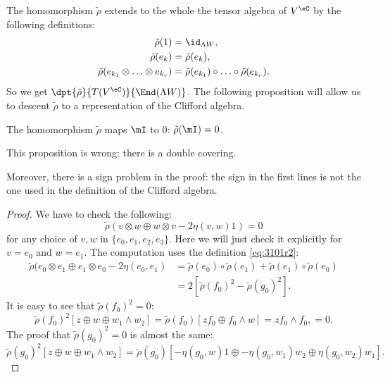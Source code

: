 The homomorphism $\tilde\rho$ extends to the whole the tensor algebra of $V^{\eC}$ by the following definitions:
\begin{subequations}
\begin{align}
 \tilde\rho(1)              &=\id_{\Lambda W},\\
 \tilde\rho(e_k)            &=\tilde\rho(e_k),\\
 \tilde\rho(e_{k_1}\otimes\ldots\otimes e_{k_r})&=
                      \tilde\rho(e_{k_1})\circ\ldots\circ\tilde\rho(e_{k_r}).\label{eq:3101r2}
\end{align}
\end{subequations}
So we get $\dpt{\tilde\rho}{T(V^{\eC})}{\End(\Lambda W)}$.  The following proposition will allow us to descent $\tilde\rho$ to a representation of the Clifford algebra.

\begin{proposition}
The homomorphism $\tilde\rho$ maps $\mI$ to $0$: $\tilde\rho(\mI)=0$.
\end{proposition}

\begin{probleme}
This proposition is wrong: there is a double covering.

Moreover, there is a sign problem in the proof: the sign in the first lines is not the one used in the definition of the Clifford algebra.
\end{probleme}


\begin{proof}
We have to check the following:
\[\tilde\rho(v\otimes w\oplus w\otimes v-2\eta(v,w)1)=0\]
for any choice of
 $v,w$ in $\{e_0,e_1,e_2,e_3\}$.
  Here we will just check it explicitly for $v=e_0$ and $w=e_1$. The computation uses the definition \eqref{eq:3101r2}:
\begin{equation}
\begin{split}
\tilde\rho(e_0\otimes e_1\oplus e_1\otimes
             e_0-2\eta(e_0,e_1)&=\tilde\rho(e_0)\circ\tilde\rho(e_1)+\tilde\rho(e_1)\circ\tilde\rho(e_0)\\
                               &=2\left[\tilde\rho(f_0)^2-\tilde\rho(g_0)^2\right].
\end{split}
\end{equation}
It is easy to see that $\tilde\rho(f_0)^2=0$:
\begin{equation}
 \tilde\rho(f_0)^2\left[z\oplus w\oplus w_1\wedge w_2 \right]=\tilde\rho(f_0)[zf_0\oplus f_0\wedge w]
                                                   =zf_0\wedge f_0,
							=0.
\end{equation}
 The proof that $\tilde\rho(g_0)^2=0$ is almost the same:
\[
 \tilde\rho(g_0)^2\left[z\oplus w\oplus w_1\wedge w_2 \right]
 =\tilde\rho(g_0)[-\eta(g_0,w)1\oplus-\eta(g_0,w_1)w_2\oplus\eta(g_0,w_2)w_1].
\]

\end{proof}

